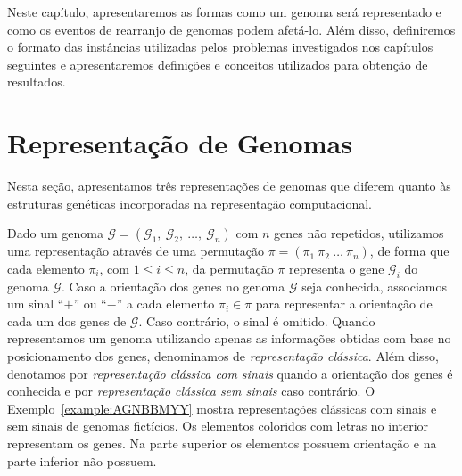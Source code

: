 
Neste capítulo, apresentaremos as formas como um genoma será representado e como os eventos de rearranjo de genomas podem afetá-lo. Além disso, definiremos o formato das instâncias utilizadas pelos problemas investigados nos capítulos seguintes e apresentaremos definições e conceitos utilizados para obtenção de resultados.

\section{Representação de Genomas}

Nesta seção, apresentamos três representações de genomas que diferem quanto às estruturas genéticas incorporadas na representação computacional.

Dado um genoma $\mathcal{G}=(\mathcal{G}_1,\:\mathcal{G}_2,\allowbreak\:\dots,\:\mathcal{G}_n)$ com $n$ genes não repetidos, utilizamos uma representação através de uma permutação $\pi=(\pi_1~\pi_2~\dots~\pi_n)$, de forma que cada elemento $\pi_i$, com $1 \le i \le n$, da permutação $\pi$ representa o gene $\mathcal{G}_i$ do genoma $\mathcal{G}$. Caso a orientação dos genes no genoma $\mathcal{G}$ seja conhecida, associamos um sinal ``$+$'' ou ``$-$'' a cada elemento $\pi_i \in \pi$ para representar a orientação de cada um dos genes de $\mathcal{G}$. Caso contrário, o sinal é omitido. Quando representamos um genoma utilizando apenas as informações obtidas com base no posicionamento dos genes, denominamos de \emph{representação clássica}. Além disso, denotamos por \emph{representação clássica com sinais} quando a orientação dos genes é conhecida e por \emph{representação clássica sem sinais} caso contrário. O Exemplo~\ref{example:AGNBBMYY} mostra representações clássicas com sinais e sem sinais de genomas fictícios. Os elementos coloridos com letras no interior representam os genes. Na parte superior os elementos possuem orientação e na parte inferior não possuem.



